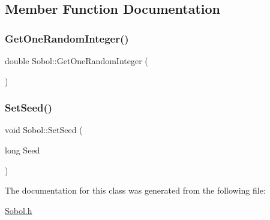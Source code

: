 \subsection{Member Function Documentation}
\hypertarget{classSobol_a86bc0fffe47e5e6f358b28224ad875f9}{}\label{classSobol_a86bc0fffe47e5e6f358b28224ad875f9} 
\subsubsection{\texorpdfstring{Get\+One\+Random\+Integer()}{GetOneRandomInteger()}}
{\footnotesize\ttfamily double Sobol\+::\+Get\+One\+Random\+Integer (\begin{DoxyParamCaption}{ }\end{DoxyParamCaption})}

\hypertarget{classSobol_aa1207baa1ee71477435ff23ecaac84f2}{}\label{classSobol_aa1207baa1ee71477435ff23ecaac84f2} 
\subsubsection{\texorpdfstring{Set\+Seed()}{SetSeed()}}
{\footnotesize\ttfamily void Sobol\+::\+Set\+Seed (\begin{DoxyParamCaption}\item[{long}]{Seed }\end{DoxyParamCaption})}



The documentation for this class was generated from the following file\+:\begin{DoxyCompactItemize}
\item 
\hyperlink{Sobol_8h}{Sobol.\+h}\end{DoxyCompactItemize}

